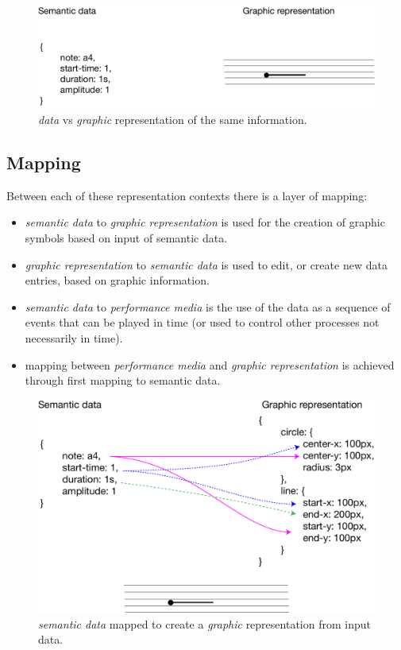 \documentclass{article}
\begin{document}
\begin{figure}[ht!]
\includegraphics[width=1\columnwidth]{graphic-representation.pdf}
\caption{\textit{data} vs \textit{graphic} representation of the same information.
\label{fig:graphic-representation}}
\end{figure}



\subsection{Mapping}\label{subsec:mapping}

Between each of these representation contexts there is a layer of mapping:

\begin{itemize}\itemsep0pt %
\item \textit{semantic data} to \textit{graphic representation} is used for the creation of graphic symbols based on input of semantic data.
\item \textit{graphic representation} to \textit{semantic data} is used to edit, or create new data entries, based on graphic information.
\item \textit{semantic data} to \textit{performance media} is the use of the data as a sequence of events that can be played in time (or used to control other processes not necessarily in time).
\item mapping between \textit{performance media} and \textit{graphic representation} is achieved through first mapping to semantic data.
\end{itemize}

\begin{figure}[ht!]
\includegraphics[width=1\columnwidth]{data-to-graphic.pdf}
\caption{\textit{semantic data} mapped to create a \textit{graphic} representation from input data.
\label{fig:data-to-graphic}}
\end{figure}
\end{document}
